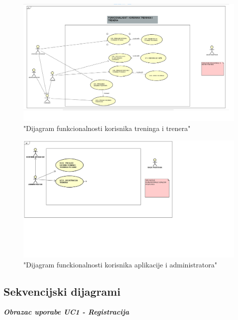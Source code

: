 			     	\begin{figure}[H]
			     		\includegraphics[scale=0.5]{dijagrami/drugidijagramou.png} %
			     		\centering
			     		\caption{"Dijagram funkcionalnosti korisnika treninga i trenera"}
			     		\label{fig:ou2}
			     	\end{figure}
		     	
		     	\begin{figure}[H]
		     		\includegraphics[scale=0.5]{dijagrami/trecidijagramou.png} %
		     		\centering
		     		\caption{"Dijagram funckionalnosti korisnika aplikacije i administratora"}
		     		\label{fig:ou3}
		     	\end{figure}
					
			\subsection{Sekvencijski dijagrami}
				
				

				\textbf{\textit{Obrazac uporabe UC1 - Registracija}}\\
	
